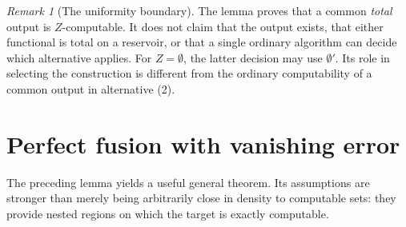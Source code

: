 \documentclass[11pt,a4paper]{article}
\theoremstyle{definition}
\theoremstyle{remark}
\newtheorem{remark}[theorem]{Remark}
\begin{document}
\begin{remark}[The uniformity boundary]
The lemma proves that a common \emph{total} output is $Z$-computable.
It does not claim that the output exists, that either functional is total
on a reservoir, or that a single ordinary algorithm can decide which
alternative applies. For $Z=\emptyset$, the latter decision may use
$\emptyset'$. Its role in selecting the construction is different from
the ordinary computability of a common output in alternative (2).
\end{remark}

\section{Perfect fusion with vanishing error}\label{sec:fusion}
The preceding lemma yields a useful general theorem. Its assumptions are
stronger than merely being arbitrarily close in density to computable sets:
they provide nested regions on which the target is exactly computable.
\end{document}
